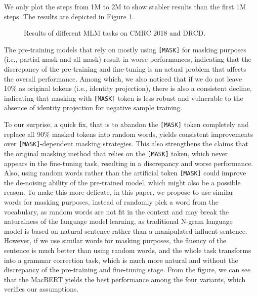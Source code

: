 \documentclass[journal]{IEEEtran}
\begin{document}
\begin{CJK*}{UTF8}{gbsn}
We only plot the steps from 1M to 2M to show stabler results than the first 1M steps.
The results are depicted in Figure \ref{discussion}.
\begin{figure}[t]
\centering
{}\centering
  \caption{\label{discussion} Results of different MLM tasks on CMRC 2018 and DRCD.}
\end{figure}

The pre-training models that rely on mostly using {\tt [MASK]} for masking purposes (i.e., partial mask and all mask) result in worse performances, indicating that the discrepancy of the pre-training and fine-tuning is an actual problem that affects the overall performance.
Among which, we also noticed that if we do not leave 10\% as original tokens (i.e., identity projection), there is also a consistent decline, indicating that masking with {\tt [MASK]} token is less robust and vulnerable to the absence of identity projection for negative sample training.

To our surprise, a quick fix, that is to abandon the {\tt [MASK]} token completely and replace all 90\% masked tokens into random words, yields consistent improvements over {\tt [MASK]}-dependent masking strategies. 
This also strengthens the claims that the original masking method that relies on the {\tt [MASK]} token, which never appears in the fine-tuning task, resulting in a discrepancy and worse performance. 
Also, using random words rather than the artificial token {\tt [MASK]} could improve the de-noising ability of the pre-trained model, which might also be a possible reason.
To make this more delicate, in this paper, we propose to use similar words for masking purposes, instead of randomly pick a word from the vocabulary, as random words are not fit in the context and may break the naturalness of the language model learning, as traditional N-gram language model is based on natural sentence rather than a manipulated influent sentence.
However, if we use similar words for masking purposes, the fluency of the sentence is much better than using random words, and the whole task transforms into a grammar correction task, which is much more natural and without the discrepancy of the pre-training and fine-tuning stage.
From the figure, we can see that the MacBERT yields the best performance among the four variants, which verifies our assumptions.



\end{CJK*}
\end{document}

